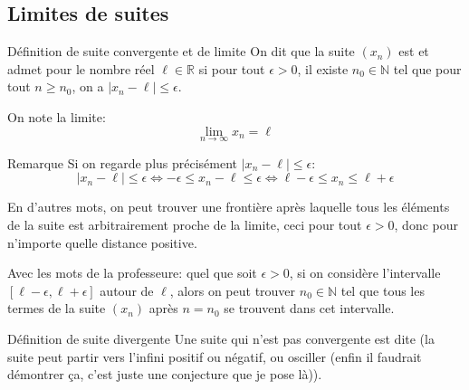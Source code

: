 \documentclass[a4paper]{article}
\begin{document}
\subsection{Limites de suites}
\begin{parag}{Définition de suite convergente et de limite}
    On dit que la suite $\left(x_n\right)$ est  et admet pour  le nombre réel $\ell \in \mathbb{R}$ si pour tout $\epsilon > 0$, il existe $n_0 \in \mathbb{N}$ tel que pour tout $n \geq n_0$, on a $\left|x_n - \ell\right| \leq \epsilon$.

    On note la limite: 
    \[\lim_{n \to \infty} x_n = \ell\]

    \begin{subparag}{Remarque}
        Si on regarde plus précisément $\left|x_n - \ell\right| \leq \epsilon$: 
        \[\left|x_n - \ell\right| \leq \epsilon \iff -\epsilon \leq x_n - \ell \leq \epsilon \iff \ell - \epsilon \leq x_n \leq \ell + \epsilon\]

        En d'autres mots, on peut trouver une frontière après laquelle tous les éléments de la suite est arbitrairement proche de la limite, ceci pour tout $\epsilon > 0$, donc pour n'importe quelle distance positive. 

        Avec les mots de la professeure: quel que soit $\epsilon > 0$, si on considère l'intervalle $\left[\ell - \epsilon, \ell + \epsilon\right]$ autour de $\ell$, alors on peut trouver $n_0 \in \mathbb{N}$ tel que tous les termes de la suite $\left(x_n\right)$ après $n = n_0$ se trouvent dans cet intervalle.
    \end{subparag}
\end{parag}

\begin{parag}{Définition de suite divergente}
    Une suite qui n'est pas convergente est dite  (la suite peut partir vers l'infini positif ou négatif, ou osciller (enfin il faudrait démontrer ça, c'est juste une conjecture que je pose là)).
\end{parag}
\end{document}
